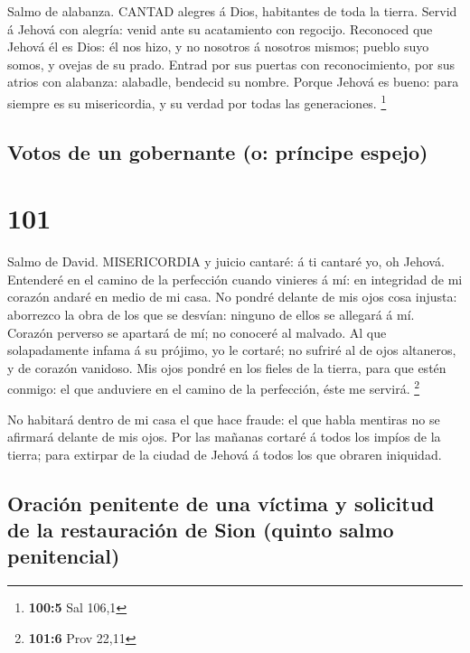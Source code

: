  Salmo de alabanza. CANTAD alegres á Dios, habitantes de
toda la tierra.  Servid á Jehová con alegría: venid ante su
acatamiento con regocijo.  Reconoced que Jehová él es Dios:
él nos hizo, y no nosotros á nosotros mismos; pueblo suyo somos, y
ovejas de su prado.  Entrad por sus puertas con
reconocimiento, por sus atrios con alabanza: alabadle, bendecid su
nombre.  Porque Jehová es bueno: para siempre es su
misericordia, y su verdad por todas las generaciones. \footnote{\textbf{100:5}
  Sal 106,1}

\hypertarget{votos-de-un-gobernante-o-pruxedncipe-espejo}{%
\subsection{Votos de un gobernante (o: príncipe
espejo)}\label{votos-de-un-gobernante-o-pruxedncipe-espejo}}

\hypertarget{section-100}{%
\section{101}\label{section-100}}

 Salmo de David. MISERICORDIA y juicio cantaré: á ti cantaré
yo, oh Jehová.  Entenderé en el camino de la perfección
cuando vinieres á mí: en integridad de mi corazón andaré en medio de mi
casa.  No pondré delante de mis ojos cosa injusta: aborrezco
la obra de los que se desvían: ninguno de ellos se allegará á mí.
 Corazón perverso se apartará de mí; no conoceré al malvado.
 Al que solapadamente infama á su prójimo, yo le cortaré; no
sufriré al de ojos altaneros, y de corazón vanidoso.  Mis
ojos pondré en los fieles de la tierra, para que estén conmigo: el que
anduviere en el camino de la perfección, éste me servirá. \footnote{\textbf{101:6}
  Prov 22,11}

 No habitará dentro de mi casa el que hace fraude: el que
habla mentiras no se afirmará delante de mis ojos.  Por las
mañanas cortaré á todos los impíos de la tierra; para extirpar de la
ciudad de Jehová á todos los que obraren iniquidad.

\hypertarget{oraciuxf3n-penitente-de-una-vuxedctima-y-solicitud-de-la-restauraciuxf3n-de-sion-quinto-salmo-penitencial}{%
\subsection{Oración penitente de una víctima y solicitud de la
restauración de Sion (quinto salmo
penitencial)}\label{oraciuxf3n-penitente-de-una-vuxedctima-y-solicitud-de-la-restauraciuxf3n-de-sion-quinto-salmo-penitencial}}

